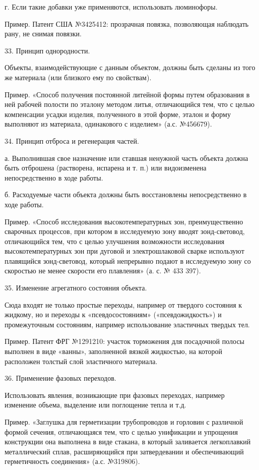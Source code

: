 г. Если такие добавки уже применяются, использовать люминофоры.

Пример. Патент США №3425412: прозрачная повязка, позволяющая наблюдать
рану, не снимая повязки.

33. Принцип однородности.

Объекты, взаимодействующие  с данным объектом, должны  быть сделаны из
того же материала (или близкого ему по свойствам).

Пример. «Способ получения постоянной  литейной формы путем образования
в ней рабочей полости по  эталону методом литья, отличающийся тем, что
с целью компенсации усадки изделия, полученного в этой форме, эталон и
форму выполняют из материала, одинакового с изделием» (а.с. №456679).

34. Принцип отброса и регенерация частей.

а.  Выполнившая свое  назначение  или ставшая  ненужной часть  объекта
должна быть отброшена (растворена, испарена  и т. п.) или видоизменена
непосредственно в ходе работы.

б. Расходуемые части объекта должны быть восстановлены непосредственно
в ходе работы.

Пример. «Способ исследования  высокотемпературных зон, преимущественно
сварочных   процессов,  при   котором   в   исследуемую  зону   вводят
зонд-световод,  отличающийся тем,  что с  целью улучшения  возможности
исследования  высокотемпературных зон  при  дуговой и  электрошлаковой
сварке используют плавящийся  зонд-световод, который непрерывно подают
в исследуемую зону  со скоростью не менее скорости  его плавления» (а.
с. № 433 397).

35. Изменение агрегатного состояния объекта.

Сюда входят не только простые переходы, например от твердого состояния
к  жидкому, но  и переходы  к «псевдосостояниям»  («псевдожидкость») и
промежуточным  состояниям, например  использование эластичных  твердых
тел.

Пример. Патент ФРГ №1291210:  участок торможения для посадочной полосы
выполнен  в виде  «ванны»,  заполненной вязкой  жидкостью, на  которой
расположен толстый слой эластичного материала.

36. Применение фазовых переходов.

Использовать  явления,  возникающие  при фазовых  переходах,  например
изменение объема, выделение или поглощение тепла и т.д.

Пример.  «Заглушка   для  герметизации  трубопроводов  и   горловин  с
различной  формой сечения,  отличающаяся тем,  что с  целью унификации
и  упрощения  конструкции она  выполнена  в  виде стакана,  в  который
заливается   легкоплавкий  металлический   сплав,  расширяющийся   при
затвердевании   и  обеспечивающий   герметичность  соединения»   (а.с.
№319806).


